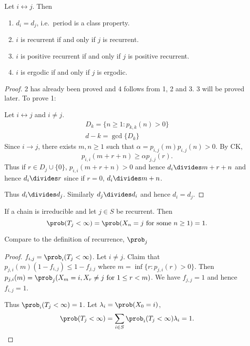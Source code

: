 \documentclass[a4paper]{article}
\newcommand*{\tot}{\leftrightarrow}
\begin{document}
\begin{theorem}
  Let \(i \tot j\). Then
  \begin{enumerate}
  \item \(d_i = d_j\), i.e.\ period is a class property.
  \item \(i\) is recurrent if and only if \(j\) is recurrent.
  \item \(i\) is positive recurrent if and only if \(j\) is positive recurrent.
  \item \(i\) is ergodic if and only if \(j\) is ergodic.
  \end{enumerate}
\end{theorem}

\begin{proof}
  2 has already been proved and 4 follows from 1, 2 and 3. 3 will be proved later. To prove 1:

  Let \(i \tot j\) and \(i \neq j\).
  \begin{align*}
    D_k = \{n \geq 1: p_{k,k}(n) > 0 \} \\
    d-k = \gcd\{D_k\}
  \end{align*}
  Since \(i \to j\), there exists \(m, n \geq 1\) such that \(\alpha = p_{i,j}(m)p_{i,j}(n) > 0\). By CK,
  \[
    p_{i,i}(m + r + n) \geq \alpha p_{j,j}(r).
  \]
  Thus if \(r \in D_j \cup \{0\}\), \(p_{i,i} (m + r + n) > 0\) and hence \(d_i \divides m + r + n\) and hence \(d_i \divides r\) since if \(r = 0\), \(d_i \divides m + n\).

  Thus \(d_i \divides d_j\). Similarly \(d_j \divides d_i\) and hence \(d_i = d_j\).
\end{proof}

\begin{proposition}
  If a chain is irreducible and let \(j \in S\) be recurrent. Then
  \[
    \prob(T_j < \infty) = \prob(X_n = j \text{ for some } n \geq 1) = 1.
  \]
\end{proposition}
Compare to the definition of recurrence, \(\prob_j\)

\begin{proof}
  \(f_{i,j} = \prob_i(T_j < \infty)\). Let \(i \neq j\). Claim that \(p_{j, i}(m)(1 - f_{i,j}) \leq 1 - f_{j,j}\) where \(m= \inf\{r: p_{j,i}(r) > 0\}\). Then \(p_{j, i}(m) = \prob_j(X_m = i, X_r \neq j \text{ for } 1 \leq r < m)\). We have \(f_{j,j} = 1\) and hence \(f_{i,j} = 1\).

  Thus \(\prob_i(T_j < \infty) = 1\). Let \(\lambda_i = \prob(X_0 = i)\),
  \[
    \prob(T_j < \infty) = \sum_{i \in S} \prob_i(T_j < \infty) \lambda_i = 1.
  \]
\end{proof}
\end{document}
